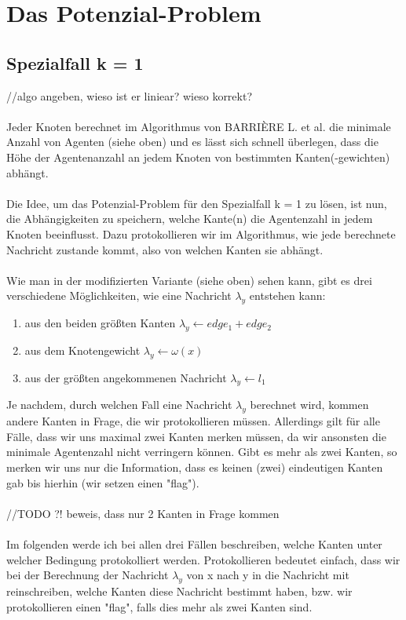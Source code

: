 \section{Das Potenzial-Problem}

\subsection{Spezialfall k = 1}
//algo angeben, wieso ist er liniear? wieso korrekt?
\\
\\
Jeder Knoten berechnet im Algorithmus von BARRIÈRE L. et al. die minimale Anzahl von Agenten (siehe oben) und es lässt sich schnell überlegen, dass die Höhe der Agentenanzahl an jedem Knoten von bestimmten Kanten(-gewichten) abhängt.
\\
\\
Die Idee, um das Potenzial-Problem für den Spezialfall k = 1 zu lösen, ist nun, die Abhängigkeiten zu speichern, welche Kante(n) die Agentenzahl in jedem Knoten beeinflusst. Dazu protokollieren wir im Algorithmus, wie jede berechnete Nachricht zustande kommt, also von welchen Kanten sie abhängt.
\\
\\ 
Wie man in der modifizierten Variante (siehe oben) sehen kann, gibt es drei verschiedene Möglichkeiten, wie eine Nachricht 	$\lambda_{y}$ entstehen kann:

\begin{enumerate}[label=\alph*)]
	
	\item aus den beiden größten Kanten $\lambda_{y} \gets edge_{1} + edge_{2}$
	
	\item aus dem Knotengewicht $\lambda_{y} \gets \omega(x)$
	
	\item aus der größten angekommenen Nachricht $\lambda_{y} \gets l_{1}$

\end{enumerate}

Je nachdem, durch welchen Fall eine Nachricht $\lambda_{y}$ berechnet wird, kommen andere Kanten in Frage, die wir protokollieren müssen.
Allerdings gilt für alle Fälle, dass wir uns maximal zwei Kanten merken müssen, da wir ansonsten die minimale Agentenzahl nicht verringern können. Gibt es mehr als zwei Kanten, so merken wir uns nur die Information, dass es keinen (zwei) eindeutigen Kanten gab bis hierhin (wir setzen einen "flag").
\\
\\
//TODO ?! beweis, dass nur 2 Kanten in Frage kommen
\\
\\
Im folgenden werde ich bei allen drei Fällen beschreiben, welche Kanten unter welcher Bedingung protokolliert werden. Protokollieren bedeutet einfach, dass wir bei der Berechnung der Nachricht $\lambda_{y}$ von x nach y  in die Nachricht mit reinschreiben, welche Kanten diese Nachricht bestimmt haben, bzw. wir protokollieren einen "flag", falls dies mehr als zwei Kanten sind.

